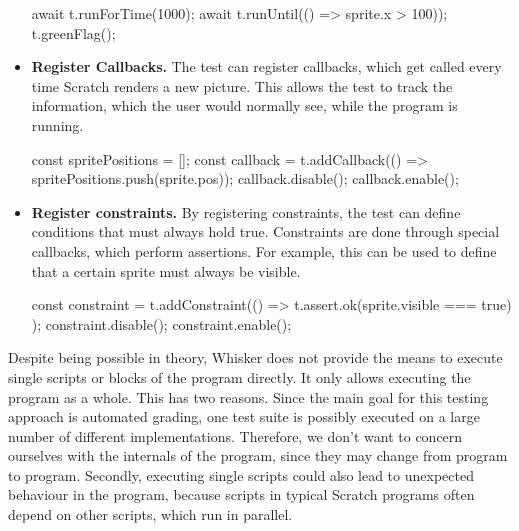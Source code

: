 \begin{itemize}
\begin{javascriptcode}
            await t.runForTime(1000);
            await t.runUntil(() => sprite.x > 100));
            t.greenFlag();
        \end{javascriptcode}
    \item \textbf{Register Callbacks.}
        The test can register callbacks, which get called every time Scratch renders a new picture.
        This allows the test to track the information, which the user would normally see, while the program is running.
        \begin{javascriptcode}
            const spritePositions = [];
            const callback = t.addCallback(() => spritePositions.push(sprite.pos));
            callback.disable();
            callback.enable();
        \end{javascriptcode}
    \item \textbf{Register constraints.}
        By registering constraints, the test can define conditions that must always hold true.
        Constraints are done through special callbacks, which perform assertions.
        For example, this can be used to define that a certain sprite must always be visible.
        \begin{javascriptcode}
            const constraint = t.addConstraint(() => {
                t.assert.ok(sprite.visible === true)
            });
            constraint.disable();
            constraint.enable();
        \end{javascriptcode}
\end{itemize}

\noindent Despite being possible in theory, Whisker does not provide the means to execute single scripts or blocks of the program directly.
It only allows executing the program as a whole.
This has two reasons.
Since the main goal for this testing approach is automated grading, one test suite is possibly executed on a large number of different implementations.
Therefore, we don't want to concern ourselves with the internals of the program, since they may change from program to program.
Secondly, executing single scripts could also lead to unexpected behaviour in the program, because scripts in typical Scratch programs often depend on other scripts, which run in parallel.

